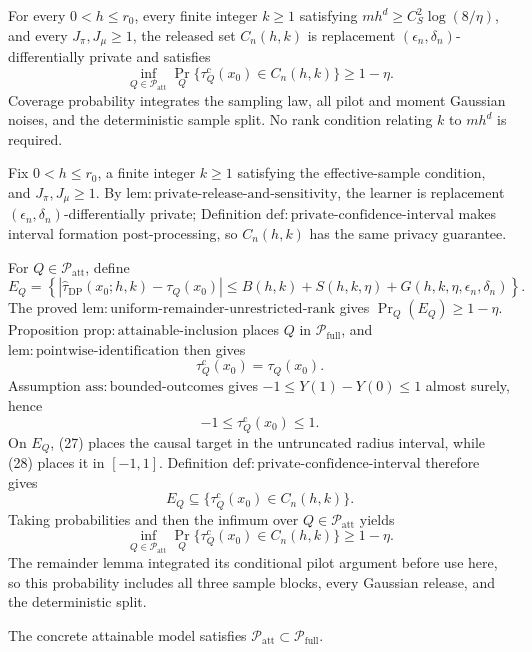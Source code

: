 For every \(0<h\le r_0\), every finite integer \(k\ge1\) satisfying \(m h^d\ge C_S^2\log(8/\eta)\), and every \(J_\pi,J_\mu\ge1\), the released set \(C_n(h,k)\) is replacement \((\epsilon_n,\delta_n)\)-differentially private and satisfies
\[
 \inf_{Q\in\mathcal P_{\mathrm{att}}}
 \Pr_Q\{\tau_Q^{\mathrm c}(x_0)\in C_n(h,k)\}\ge1-\eta.
\]
Coverage probability integrates the sampling law, all pilot and moment Gaussian noises, and the deterministic sample split.  No rank condition relating \(k\) to \(m h^d\) is required.

Fix \(0<h\le r_0\), a finite integer \(k\ge1\) satisfying the effective-sample condition, and \(J_\pi,J_\mu\ge1\).  By \(\mathrm{lem{:}private\text{-}release\text{-}and\text{-}sensitivity}\), the learner is replacement \((\epsilon_n,\delta_n)\)-differentially private; Definition \(\mathrm{def{:}private\text{-}confidence\text{-}interval}\) makes interval formation post-processing, so \(C_n(h,k)\) has the same privacy guarantee.

For \(Q\in\mathcal P_{\mathrm{att}}\), define
\[
 E_Q=\left\{
 \left|\widehat\tau_{\mathrm{DP}}(x_0;h,k)-\tau_Q(x_0)\right|
 \le B(h,k)+S(h,k,\eta)+G(h,k,\eta,\epsilon_n,\delta_n)
 \right\}.
\]
The proved \(\mathrm{lem{:}uniform\text{-}remainder\text{-}unrestricted\text{-}rank}\) gives \(\Pr_Q(E_Q)\ge1-\eta\).  Proposition \(\mathrm{prop{:}attainable\text{-}inclusion}\) places \(Q\) in \(\mathcal P_{\mathrm{full}}\), and \(\mathrm{lem{:}pointwise\text{-}identification}\) then gives
\[
 \tau_Q^{\mathrm c}(x_0)=\tau_Q(x_0).                         \tag{27}
\]
Assumption \(\mathrm{ass{:}bounded\text{-}outcomes}\) gives \(-1\le Y(1)-Y(0)\le1\) almost surely, hence
\[
 -1\le\tau_Q^{\mathrm c}(x_0)\le1.                           \tag{28}
\]
On \(E_Q\), (27) places the causal target in the untruncated radius interval, while (28) places it in \([-1,1]\).  Definition \(\mathrm{def{:}private\text{-}confidence\text{-}interval}\) therefore gives
\[
 E_Q\subseteq\{\tau_Q^{\mathrm c}(x_0)\in C_n(h,k)\}.
\]
Taking probabilities and then the infimum over \(Q\in\mathcal P_{\mathrm{att}}\) yields
\[
 \inf_{Q\in\mathcal P_{\mathrm{att}}}
 \Pr_Q\{\tau_Q^{\mathrm c}(x_0)\in C_n(h,k)\}\ge1-\eta.
\]
The remainder lemma integrated its conditional pilot argument before use here, so this probability includes all three sample blocks, every Gaussian release, and the deterministic split.

The concrete attainable model satisfies \(\mathcal P_{\mathrm{att}}\subset\mathcal P_{\mathrm{full}}\).

